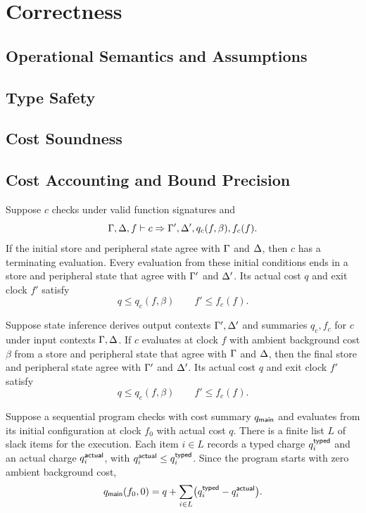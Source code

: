 \section{Correctness}
\subsection{Operational Semantics and Assumptions}
\subsection{Type Safety}
\subsection{Cost Soundness}
\subsection{Cost Accounting and Bound Precision}


\begin{thm}
\label{thm:type-soundness}
Suppose $c$ checks under valid function signatures and
\[
\Gamma, \Delta, f \vdash c
\Rightarrow \Gamma', \Delta', q_c(f,\beta), f_c(f).
\]
If the initial store and peripheral state agree with $\Gamma$ and
$\Delta$, then $c$ has a terminating evaluation. Every evaluation from
these initial conditions ends in a store and peripheral state that
agree with $\Gamma'$ and $\Delta'$. Its actual cost $q$ and exit clock
$f'$ satisfy
\[
q \leq q_c(f,\beta)
\qquad
f' \leq f_c(f).
\]
\end{thm}

\begin{thm}
\label{thm:inference-soundness}
Suppose state inference derives output contexts $\Gamma', \Delta'$
and summaries $q_c, f_c$ for $c$ under input contexts $\Gamma, \Delta$.
If $c$ evaluates at clock $f$ with ambient background cost $\beta$
from a store and peripheral state that agree with $\Gamma$ and $\Delta$,
then the final store and peripheral state agree with $\Gamma'$ and
$\Delta'$. Its actual cost $q$ and exit clock $f'$ satisfy
\[
q \leq q_c(f,\beta)
\qquad
f' \leq f_c(f).
\]
\end{thm}

\begin{thm}
\label{thm:slack-decomposition}
Suppose a sequential program checks with cost summary $q_{\mathsf{main}}$
and evaluates from its initial configuration at clock $f_0$ with
actual cost $q$. There is a finite list $L$ of slack items for the
execution. Each item $i \in L$ records a typed charge
$q_i^{\mathsf{typed}}$ and an actual charge $q_i^{\mathsf{actual}}$, with
$q_i^{\mathsf{actual}} \leq q_i^{\mathsf{typed}}$. Since the program starts with
zero ambient background cost,
\[
q_{\mathsf{main}}(f_0,0)
=
q + \sum_{i \in L}
\bigl(q_i^{\mathsf{typed}} - q_i^{\mathsf{actual}}\bigr).
\]
\end{thm}